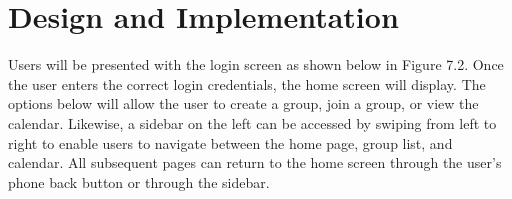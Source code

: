 \chapter{Design and Implementation}
Users will be presented with the login screen as shown below in Figure 7.2. Once the user enters the correct login credentials, the home screen will display. The options below will allow the user to create a group, join a group, or view the calendar. Likewise, a sidebar on the left can be accessed by swiping from left to right to enable users to navigate between the home page, group list, and calendar. All subsequent pages can return to the home screen through the user’s phone back button or through the sidebar.

